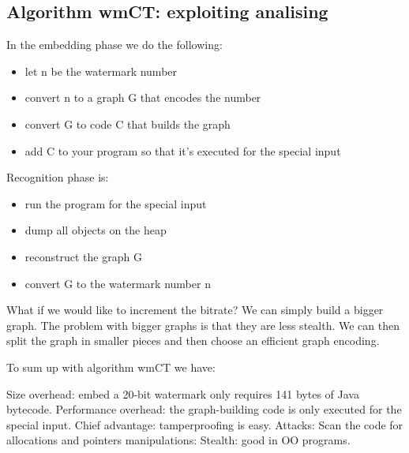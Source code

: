 \subsection{Algorithm wmCT: exploiting analising}

In the embedding phase we do the following:
\begin{itemize}
    \item let n be the watermark number 
    \item convert n to a graph G that encodes the number
    \item convert G to code C that builds the graph 
    \item add C to your program so that it's executed for the special input
\end{itemize}

Recognition phase is:
\begin{itemize}
    \item run the program for the special input 
    \item dump all objects on the heap 
    \item reconstruct the graph G 
    \item convert G to the watermark number n
\end{itemize}

What if we would like to increment the bitrate? 
We can simply build a bigger graph. The problem with bigger graphs is that they are less stealth. 
We can then split the graph in smaller pieces and then choose an efficient graph encoding.

To sum up with algorithm wmCT we have: 

Size overhead: embed a 20-bit watermark only requires 141 bytes of Java bytecode.\newline 
Performance overhead: the graph-building code is only executed for the special input. \newline 
Chief advantage: tamperproofing is easy. \newline 
Attacks: Scan the code for allocations and pointers manipulations:
Stealth: good in OO programs. 